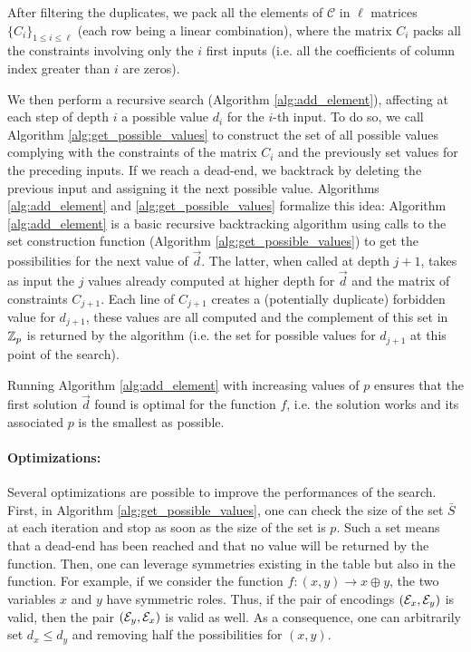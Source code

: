 After filtering the duplicates, we pack all the elements of $\mathcal{C}$ in $\ell$ matrices $\{C_i\}_{1 \le i \le \ell}$ (each row being a linear combination), where the matrix $C_i$ packs all the constraints involving only the $i$ first inputs (i.e. all the coefficients of column index greater than $i$ are zeros).


We then perform a recursive search (Algorithm \ref{alg:add_element}), affecting at each step of depth $i$ a possible value $d_i$ for the $i$-th input. To do so, we call Algorithm \ref{alg:get_possible_values} to construct the set of all possible values complying with the constraints of the matrix $C_i$ and the previously set values for the preceding inputs. If we reach a dead-end, we backtrack by deleting the previous input and assigning it the next possible value. Algorithms \ref{alg:add_element} and \ref{alg:get_possible_values} formalize this idea: Algorithm \ref{alg:add_element} is a  basic recursive backtracking algorithm using calls to the set construction function (Algorithm \ref{alg:get_possible_values}) to get the possibilities for the next value of $\vec{d}$. The latter, when called at depth $j+1$, takes as input the 
$j$ values already computed at higher depth for $\vec{d}$ and the matrix of constraints $C_{j+1}$. Each line of $C_{j+1}$ creates a (potentially duplicate) forbidden value for $d_{j+1}$, these values are all computed and the complement of this set in $\mathbb{Z}_p$ is returned by the algorithm (i.e. the set for possible values for $d_{j+1}$ at this point of the search).

\begin{theorem}
     Running Algorithm \ref{alg:add_element} with increasing values of $p$ ensures that the first solution $\vec d$ found is optimal for the function $f$, i.e. the solution works and its associated $p$ is the smallest as possible.   
\end{theorem}






\paragraph{Optimizations:} Several optimizations are possible to improve the performances of the search. First, in Algorithm \ref{alg:get_possible_values}, one can check the size of the set $\bar S$ at each iteration and stop as soon as the size of the set is $p$. Such a set means that a dead-end has been reached and that no value will be returned by the function. Then, one can leverage symmetries existing in the table but also in the function. For example, if we consider the function $f: (x, y) \longrightarrow x \oplus y$, the two variables $x$ and $y$ have symmetric roles. Thus, if the pair of encodings $(\mathcal{E}_x, \mathcal{E}_y)$ is valid, then the pair $(\mathcal{E}_y, \mathcal{E}_x)$ is valid as well. As a consequence, one can arbitrarily set $d_x \le d_y$ and removing half the possibilities for $(x, y)$.




